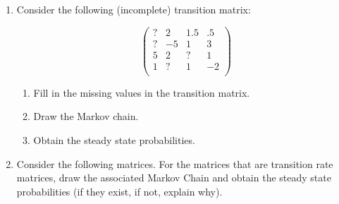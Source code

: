 \documentclass[12pt]{article}
\begin{document}
\begin{enumerate}
\item Consider the following (incomplete) transition matrix:

$$
\begin{pmatrix}
?&2&1.5&.5\\
?&-5&1&3\\
5&2&?&1\\
1&?&1&-2\\
\end{pmatrix}
$$
\begin{enumerate}
	\item Fill in the missing values in the transition matrix.
	\item Draw the Markov chain.
	\item Obtain the steady state probabilities.
\end{enumerate}

\item Consider the following matrices. For the matrices that are transition rate matrices, draw the associated Markov Chain and obtain the steady state probabilities (if they exist, if not, explain why).


\end{enumerate}
\end{document}
